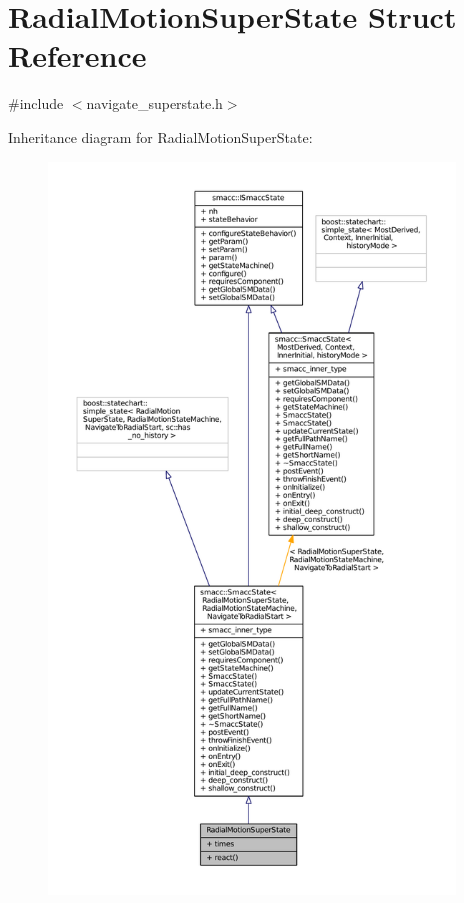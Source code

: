 \hypertarget{structRadialMotionSuperState}{}\section{Radial\+Motion\+Super\+State Struct Reference}
\label{structRadialMotionSuperState}


{\ttfamily \#include $<$navigate\+\_\+superstate.\+h$>$}



Inheritance diagram for Radial\+Motion\+Super\+State\+:
\nopagebreak
\begin{figure}[H]
\begin{center}
\leavevmode
\includegraphics[height=550pt]{structRadialMotionSuperState__inherit__graph}
\end{center}
\end{figure}


